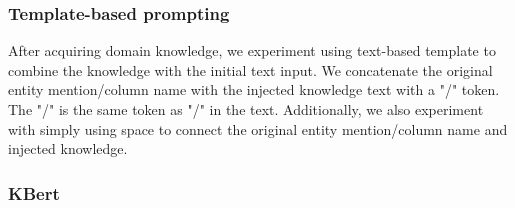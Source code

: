 
\subsubsection{Template-based prompting}
After acquiring domain knowledge, we experiment using text-based template to combine the knowledge with the initial text input. We concatenate the original entity mention/column name with the injected knowledge text with a "/" token. The "/" is the same token as "/" in the text. 
Additionally, we also experiment with simply using space to connect the original entity mention/column name and injected knowledge. 



\subsubsection{KBert}



